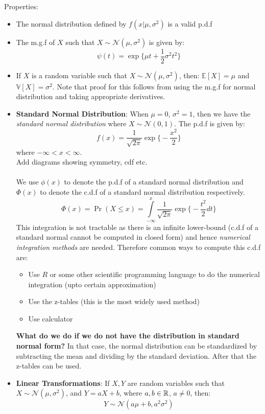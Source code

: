 \documentclass[english, 11pt]{article}
\begin{document}
Properties:
\begin{itemize}
\item The normal distribution defined by $f(x | \mu, \sigma^2)$ is a valid p.d.f
\item The m.g.f of $X$ such that $X \sim \mathcal{N}(\mu, \sigma^2)$ is given by:
\[ \psi (t) = \exp \bigg\{ \mu t + \frac{1}{2} \sigma^2 t^2 \bigg\} \]

\item If $X$ is a random variable such that $X \sim \mathcal{N}(\mu, \sigma^2)$, then: $\mathbb{E}[X] = \mu$ and $\mathbb{V}[X] = \sigma^2$. Note that proof for this follows from using the m.g.f for normal distribution and taking appropriate derivatives.

\item {\bf Standard Normal Distribution}: When $\mu = 0$, $\sigma^2 = 1$, then we have the {\it standard normal distribution} where $X \sim \mathcal{N}(0, 1)$. The p.d.f is given by:
\[ f(x) = \frac{1}{\sqrt{2 \pi}} \exp \bigg\{ - \frac{x^2}{2} \bigg\} \] 
where $-\infty < x < \infty$. \\
Add diagrams showing symmetry, cdf etc.\\ \\
We use $\phi(x)$ to denote the p.d.f of a standard normal distribution and $\Phi(x)$ to denote the c.d.f of a standard normal distribution respectively.
\[ \Phi(x) = \Pr(X \le x) = \int\limits_{-\infty}^{x} \frac{1}{\sqrt{2 \pi}} \exp \bigg\{ - \frac{t^2}{2} dt \bigg\} \]
This integration is not tractable as there is an infinite lower-bound (c.d.f of a standard normal cannot be computed in closed form) and hence {\it numerical integration methods} are needed. Therefore common ways to compute this c.d.f are:
\begin{itemize}
\item Use $R$ or some other scientific programming language to do the numerical integration (upto certain approximation)
\item Use the z-tables (this is the most widely used method)
\item Use calculator
\end{itemize}
{\bf What do we do if we do not have the distribution in standard normal form?} In that case, the normal distribution can be standardized by subtracting the mean and dividing by the standard deviation. After that the z-tables can be used.

\item {\bf Linear Transformations}: If $X, Y$ are random variables such that $X \sim \mathcal{N} (\mu, \sigma^2)$, and $Y = aX + b$, where $a, b \in {\mathbb{R}}$, $a \neq 0$, then:
\[ Y \sim \mathcal{N} (a\mu+b, a^2 \sigma^2) \]


\end{itemize}
\end{document}
